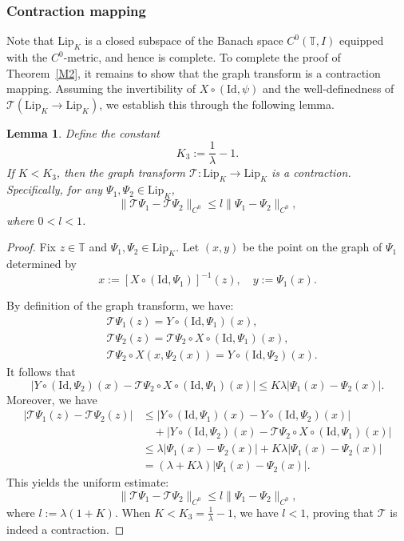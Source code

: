 \documentclass{amsart}
\newcommand{\Lip}{\mathrm{Lip}}
\newcommand{\Id}{\mathrm{Id}}
\newcommand{\T}{\mathbb{T}}
\newtheorem{Lemma}[Definition]{Lemma}
\begin{document}
	
	
	
	\subsubsection{Contraction mapping}
	Note that $\Lip_K$ is a closed subspace of the Banach space $C^0(\T,I)$ equipped with the $C^0$-metric, and hence is complete. To complete the proof of Theorem~\ref{M2}, it remains to show that the graph transform is a contraction mapping. Assuming the invertibility of $X \circ (\Id,\psi)$ and the well-definedness of $\mathcal{T}(\Lip_K\to \Lip_K)$, we establish this through the following lemma.
	
	\begin{Lemma}\label{ctrmap}
		Define the constant
		\[
		K_3 := \frac{1}{\lambda} - 1.
		\]
		If $K < K_3$, then the graph transform $\mathcal{T}: \Lip_K \to \Lip_K$ is a contraction. Specifically, for any $\Psi_1, \Psi_2 \in \Lip_K$,
		\[
		\|\mathcal{T}\Psi_1 - \mathcal{T}\Psi_2\|_{C^0} \leq l \|\Psi_1 - \Psi_2\|_{C^0},
		\]
		where $0 < l < 1$.
	\end{Lemma}
	
	\begin{proof}
		Fix $z \in \T$ and $\Psi_1, \Psi_2 \in \Lip_K$. Let $(x,y)$ be the point on the graph of $\Psi_1$ determined by
		\[
		x := [X \circ (\Id, \Psi_1)]^{-1}(z), \quad y := \Psi_1(x).
		\]
		
		By definition of the graph transform, we have:
		\begin{align*}
			&\mathcal{T}\Psi_1(z) = Y\circ(\Id, \Psi_1)(x), \\
			&\mathcal{T}\Psi_2(z) = \mathcal{T}\Psi_2 \circ X\circ(\Id, \Psi_1)(x),\\
			&\mathcal{T}\Psi_2 \circ X(x, \Psi_2(x)) =Y\circ(\Id, \Psi_2)(x).
		\end{align*}
		It follows that
		\[|Y\circ(\Id, \Psi_2)(x) - \mathcal{T}\Psi_2 \circ X\circ(\Id, \Psi_1)(x)|\leq K\lambda |\Psi_1(x) - \Psi_2(x)|.\]
		Moreover, we have
		\begin{align*}
			|\mathcal{T}\Psi_1(z) - \mathcal{T}\Psi_2(z)|
			&\leq |Y\circ(\Id, \Psi_1)(x) - Y\circ(\Id, \Psi_2)(x)| \\
			&\quad + |Y\circ(\Id, \Psi_2)(x) - \mathcal{T}\Psi_2 \circ X\circ(\Id, \Psi_1)(x)| \\
			&\leq \lambda |\Psi_1(x) - \Psi_2(x)| + K\lambda |\Psi_1(x) - \Psi_2(x)| \\
			&= (\lambda + K\lambda) |\Psi_1(x) - \Psi_2(x)|.
		\end{align*}
		This yields the uniform estimate:
		\[
		\|\mathcal{T}\Psi_1 - \mathcal{T}\Psi_2\|_{C^0} \leq l \|\Psi_1 - \Psi_2\|_{C^0},
		\]
		where $l := \lambda(1 + K)$. When $K < K_3 = \frac{1}{\lambda} - 1$, we have $l < 1$, proving that $\mathcal{T}$ is indeed a contraction.
	\end{proof}
	
\end{document}
